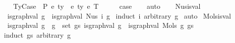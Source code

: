 \begin{isabellebody}
\ \ \isamarkupfalse%
\ {\isacharparenleft}{\kern0pt}TyCase\ {\isasymGamma}\ P\ e{}\ ty{}\ {\isasymGamma}{}\ e{}\ ty{}\ e{}\ T{\isacharparenright}{\kern0pt}\isanewline
\ \ \isamarkupfalse%
\ \isamarkupfalse%
\ {\isacharquery}{\kern0pt}case\isanewline
\ \ \isamarkupfalse%
\ auto\isanewline
\ \ \isamarkupfalse%
\isanewline
{}\isamarkupfalse%
%
\endisatagproof
{\isafoldproof}%
%
\isadelimproof
%
\endisadelimproof
%
\isadelimdocument
%
\endisadelimdocument
%
\isatagdocument
%
\isamarkuptrue%
%
\endisatagdocument
{\isafolddocument}%
%
\isadelimdocument
%
\endisadelimdocument
{}\isamarkupfalse%
\ Nus{\isacharunderscore}{\kern0pt}is{\isacharunderscore}{\kern0pt}val{\isacharcolon}{\kern0pt}\isanewline
\ \ {\isachardoublequoteopen}is{\isacharunderscore}{\kern0pt}graph{\isacharunderscore}{\kern0pt}val\ g\ {\isacharequal}{\kern0pt}\ is{\isacharunderscore}{\kern0pt}graph{\isacharunderscore}{\kern0pt}val\ {\isacharparenleft}{\kern0pt}Nus{}\ i\ g{\isacharparenright}{\kern0pt}{\isachardoublequoteclose}\isanewline
%
\isadelimproof
%
\endisadelimproof
%
\isatagproof
{}\isamarkupfalse%
\ {\isacharparenleft}{\kern0pt}induct\ i\ arbitrary{\isacharcolon}{\kern0pt}\ g{\isacharparenright}{\kern0pt}\isanewline
{}\isamarkupfalse%
\ auto%
\endisatagproof
{\isafoldproof}%
%
\isadelimproof
\isanewline
%
\endisadelimproof
\isanewline
\isanewline
{}\isamarkupfalse%
\ Mols{}{\isacharunderscore}{\kern0pt}is{\isacharunderscore}{\kern0pt}val{\isacharcolon}{\kern0pt}\isanewline
\ \ {\isachardoublequoteopen}{\isacharparenleft}{\kern0pt}is{\isacharunderscore}{\kern0pt}graph{\isacharunderscore}{\kern0pt}val\ g\ {\isasymand}\ {\isacharparenleft}{\kern0pt}{\isasymforall}g\ {\isasymin}\ set\ gs{\isachardot}{\kern0pt}\ is{\isacharunderscore}{\kern0pt}graph{\isacharunderscore}{\kern0pt}val\ g{\isacharparenright}{\kern0pt}{\isacharparenright}{\kern0pt}\ {\isacharequal}{\kern0pt}\ is{\isacharunderscore}{\kern0pt}graph{\isacharunderscore}{\kern0pt}val\ {\isacharparenleft}{\kern0pt}Mols{}\ g\ gs{\isacharparenright}{\kern0pt}{\isachardoublequoteclose}\isanewline
%
\isadelimproof
%
\endisadelimproof
%
\isatagproof
{}\isamarkupfalse%
\ {\isacharparenleft}{\kern0pt}induct\ gs\ arbitrary{\isacharcolon}{\kern0pt}\ g{\isacharparenright}{\kern0pt}\isanewline
\ \ \isamarkupfalse%

\end{isabellebody}
